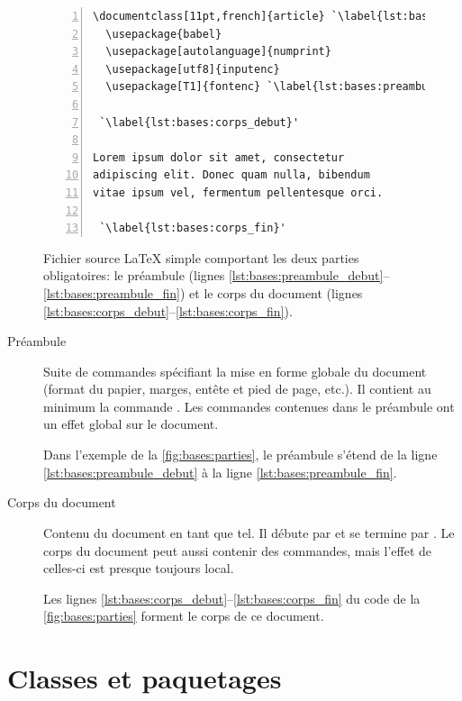 \begin{figure}
  \centering
  \begin{minipage}{0.75\linewidth}
\begin{lstlisting}[numbers=left, numberstyle=\tiny,
                   frame=single, rulecolor=\color{black}, framesep=6pt]
\documentclass[11pt,french]{article} `\label{lst:bases:preambule_debut}'
  \usepackage{babel}
  \usepackage[autolanguage]{numprint}
  \usepackage[utf8]{inputenc}
  \usepackage[T1]{fontenc} `\label{lst:bases:preambule_fin}'

 `\label{lst:bases:corps_debut}'

Lorem ipsum dolor sit amet, consectetur
adipiscing elit. Donec quam nulla, bibendum
vitae ipsum vel, fermentum pellentesque orci.

 `\label{lst:bases:corps_fin}'
\end{lstlisting}
  \end{minipage}
  \caption{Fichier source {\LaTeX} simple comportant les deux parties
    obligatoires: le préambule (lignes
    \ref*{lst:bases:preambule_debut}--\ref*{lst:bases:preambule_fin})
    et le corps du document (lignes
    \ref*{lst:bases:corps_debut}--\ref*{lst:bases:corps_fin}).}
  \label{fig:bases:parties}
\end{figure}

\begin{description}
\item[Préambule] Suite de commandes spécifiant la mise en forme
  globale du document (format du papier, marges, entête et pied de
  page, etc.). Il contient au minimum la commande
  \cmd{\documentclass}. Les commandes contenues dans le préambule ont
  un effet global sur le document.

  Dans l'exemple de la \autoref{fig:bases:parties}, le préambule
  s'étend de la ligne \ref*{lst:bases:preambule_debut} à la ligne
  \ref*{lst:bases:preambule_fin}.
\item[Corps du document] Contenu du document en tant que tel.
  Il débute par \verb== et se termine par
    \verb==. Le corps du document peut aussi contenir
  des commandes, mais l'effet de celles-ci est presque toujours local.

  Les lignes \ref*{lst:bases:corps_debut}--\ref*{lst:bases:corps_fin}
  du code de la \autoref{fig:bases:parties} forment le corps de ce
  document.
\end{description}


\section{Classes et paquetages}
\label{sec:bases:classes}

